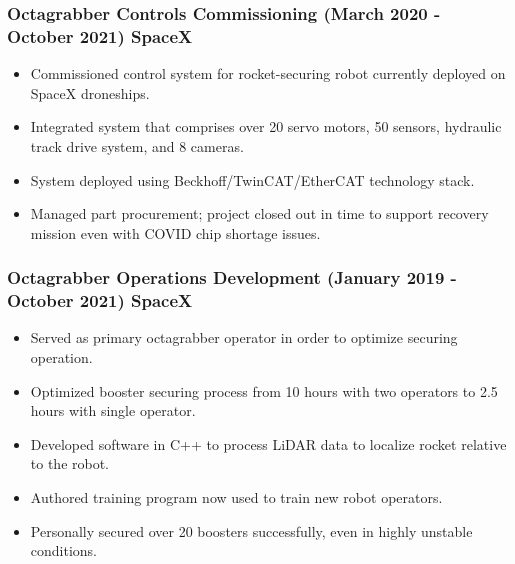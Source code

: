\documentclass[11pt]{article}
\begin{document}
    \subsubsection*{Octagrabber Controls Commissioning
                    (March 2020 - October 2021) \hfill SpaceX}
		\begin{itemize}
		    \setlength\itemsep{-0.5em}
		    \item Commissioned control system for rocket-securing robot
		          currently deployed on SpaceX droneships.
            \item Integrated system that comprises over 20 servo motors, 
                  50 sensors, hydraulic track drive system, and
                  8 cameras.
            \item System deployed using Beckhoff/TwinCAT/EtherCAT technology
                  stack.
		    \item Managed part procurement; project closed out in time to 
		          support recovery mission even with COVID chip shortage 
		          issues.
		    
		\end{itemize}
	
	\subsubsection*{Octagrabber Operations Development 
	                (January 2019 - October 2021) \hfill SpaceX}
        \begin{itemize}
            \setlength\itemsep{-0.5em}
            \item Served as primary octagrabber operator in order to 
                  optimize securing operation. 
            \item Optimized booster securing process from 10 hours with two operators to 2.5 hours with single operator.
            \item Developed software in C++ to process LiDAR data to localize 
                  rocket relative to the robot.
            \item Authored training program now used to train new robot
                  operators.
            \item Personally secured over 20 boosters successfully,
                  even in highly unstable conditions.
        \end{itemize}
\end{document}
